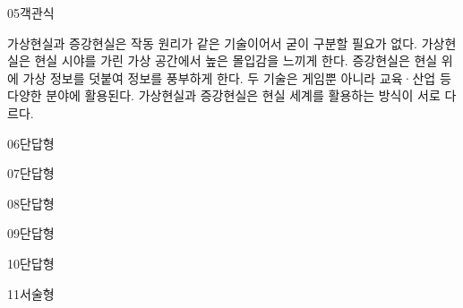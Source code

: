 \documentclass[fs85,seriesRus]{korfarm-base}
\begin{document}
\begin{kfQBlock}{05}{객관식}
\begin{kfChoices}
\kfChoice 가상현실과 증강현실은 작동 원리가 같은 기술이어서 굳이 구분할 필요가 없다.
\kfChoice 가상현실은 현실 시야를 가린 가상 공간에서 높은 몰입감을 느끼게 한다.
\kfChoice 증강현실은 현실 위에 가상 정보를 덧붙여 정보를 풍부하게 한다.
\kfChoice 두 기술은 게임뿐 아니라 교육·산업 등 다양한 분야에 활용된다.
\kfChoice 가상현실과 증강현실은 현실 세계를 활용하는 방식이 서로 다르다.
\end{kfChoices}
\end{kfQBlock}
\begin{kfQBlock}{06}{단답형}
\end{kfQBlock}
\begin{kfQBlock}{07}{단답형}
\end{kfQBlock}
\begin{kfQBlock}{08}{단답형}
\end{kfQBlock}
\begin{kfQBlock}{09}{단답형}
\end{kfQBlock}
\begin{kfQBlock}{10}{단답형}
\end{kfQBlock}
\begin{kfQBlock}{11}{서술형}
\end{kfQBlock}
\kfEndMC
\end{document}
